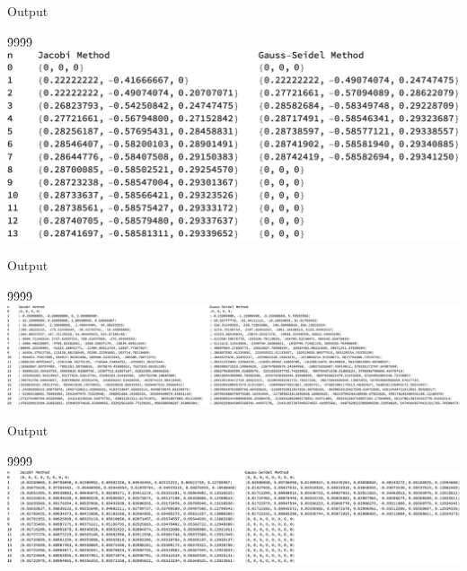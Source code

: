 \documentclass[12pt,twoside,openany]{memoir}
\begin{document}
\begin{mmaCell}{Output}

\end{mmaCell}
\vspace{-5pt}\h9\h9\h9\h9\includegraphics[scale=0.65]{hw5q1p1}

\begin{mmaCell}{Output}

\end{mmaCell}
\vspace{-5pt}\h9\h9\h9\h9\includegraphics[scale=0.35]{hw5q1p3}

\newpage
\begin{mmaCell}{Output}

\end{mmaCell}
\vspace{-5pt}\h9\h9\h9\h9\includegraphics[scale=0.35]{hw5q1p4}
\end{document}
